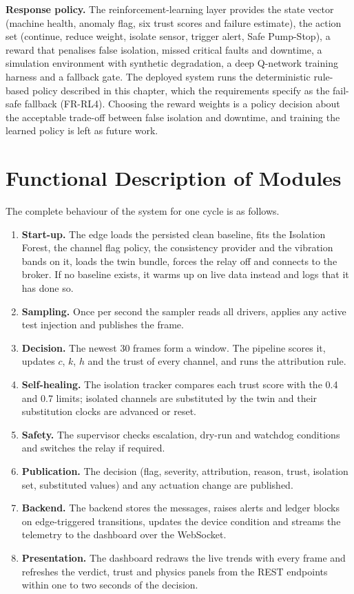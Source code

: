 \textbf{Response policy.} The reinforcement-learning layer provides the state vector (machine health, anomaly flag, six trust scores and failure estimate), the action set (continue, reduce weight, isolate sensor, trigger alert, Safe Pump-Stop), a reward that penalises false isolation, missed critical faults and downtime, a simulation environment with synthetic degradation, a deep Q-network training harness and a fallback gate. The deployed system runs the deterministic rule-based policy described in this chapter, which the requirements specify as the fail-safe fallback (FR-RL4). Choosing the reward weights is a policy decision about the acceptable trade-off between false isolation and downtime, and training the learned policy is left as future work.

\section{Functional Description of Modules}

The complete behaviour of the system for one cycle is as follows.

\begin{enumerate}
  \item \textbf{Start-up.} The edge loads the persisted clean baseline, fits the Isolation Forest, the channel flag policy, the consistency provider and the vibration bands on it, loads the twin bundle, forces the relay off and connects to the broker. If no baseline exists, it warms up on live data instead and logs that it has done so.
  \item \textbf{Sampling.} Once per second the sampler reads all drivers, applies any active test injection and publishes the frame.
  \item \textbf{Decision.} The newest 30 frames form a window. The pipeline scores it, updates $c$, $k$, $h$ and the trust of every channel, and runs the attribution rule.
  \item \textbf{Self-healing.} The isolation tracker compares each trust score with the 0.4 and 0.7 limits; isolated channels are substituted by the twin and their substitution clocks are advanced or reset.
  \item \textbf{Safety.} The supervisor checks escalation, dry-run and watchdog conditions and switches the relay if required.
  \item \textbf{Publication.} The decision (flag, severity, attribution, reason, trust, isolation set, substituted values) and any actuation change are published.
  \item \textbf{Backend.} The backend stores the messages, raises alerts and ledger blocks on edge-triggered transitions, updates the device condition and streams the telemetry to the dashboard over the WebSocket.
  \item \textbf{Presentation.} The dashboard redraws the live trends with every frame and refreshes the verdict, trust and physics panels from the REST endpoints within one to two seconds of the decision.
\end{enumerate}
